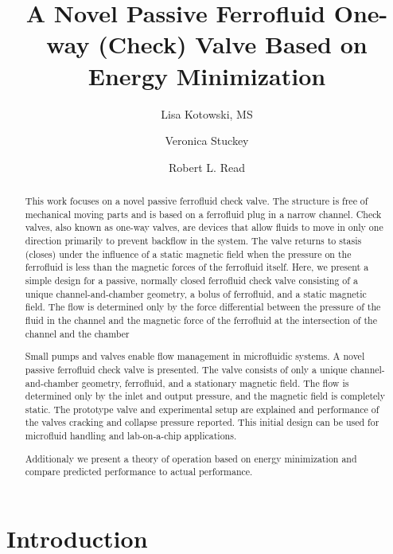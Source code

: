 \documentclass[]{asme2ej}
\title{A Novel Passive Ferrofluid One-way (Check) Valve Based on Energy Minimization}
\author{Lisa Kotowski, MS

}
\author{Veronica Stuckey
  \affiliation{
    Biomedical Engineer, University of Texas at Austin \\
    }
}
\author{Robert L. Read
\affiliation{
  Founder, Public Invention\\
    }
}
\begin{document}
\maketitle

\begin{abstract}

This work focuses on a novel passive ferrofluid check valve. The structure is free of mechanical moving parts and is based on a ferrofluid plug in a narrow channel.
Check valves, also known as one-way valves, are devices that allow fluids to move in only one direction primarily to prevent backflow in the system.
The valve returns to stasis (closes) under the influence of a static magnetic field when the pressure on the ferrofluid is less than the magnetic forces of the ferrofluid itself.
Here, we present a simple design for a passive, normally closed ferrofluid check valve consisting of a unique channel-and-chamber geometry, a bolus of ferrofluid, and a static magnetic field.
The flow is determined only by the force differential between the pressure of the fluid in the channel and the magnetic force of the ferrofluid at the intersection of the channel and the chamber

Small pumps and valves enable flow management in microfluidic systems.
A novel passive ferrofluid check valve is presented.
The valve consists of only a
unique channel-and-chamber geometry, ferrofluid, and a stationary
magnetic field.
The flow is determined only by the inlet and output pressure,
and the magnetic field is completely static.
The prototype valve and experimental setup are explained
and performance of the valves cracking and collapse pressure reported.
This initial design can be used for microfluid handling and lab-on-a-chip
applications.

Additionaly we present a theory of operation based on energy minimization
and compare predicted performance to actual performance.
\end{abstract}

\section{Introduction}
\end{document}
